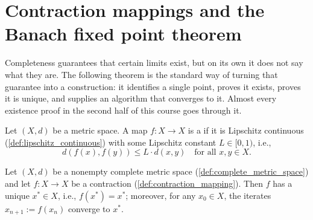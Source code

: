
\section{Contraction mappings and the Banach fixed point theorem}
\label{sec:banach_fixed_point}

Completeness guarantees that certain limits exist, but on its own it does not say what they are.
The following theorem is the standard way of turning that guarantee into a construction: it
identifies a single point, proves it exists, proves it is unique, and supplies an algorithm that
converges to it. Almost every existence proof in the second half of this course goes through it.

\begin{definition}
\label{def:contraction_mapping}
Let $(X,d)$ be a metric space. A map $f : X \to X$ is a 
 if it is Lipschitz continuous (\cref{def:lipschitz_continuous}) with
some Lipschitz constant $L \in [0,1)$, i.e.,
\[d(f(x),f(y)) \leq L \cdot d(x,y) \quad \text{for all } x,y \in X.\]
\end{definition}

\begin{theorem}
\label{thm:banach_fixed_point}
Let $(X,d)$ be a nonempty complete metric space (\cref{def:complete_metric_space}) and let
$f : X \to X$ be a contraction (\cref{def:contraction_mapping}). Then $f$ has a unique
  $x^* \in X$, i.e., $f(x^*) = x^*$; moreover, for any
$x_0 \in X$, the iterates $x_{n+1} := f(x_n)$ converge to $x^*$.
\end{theorem}

